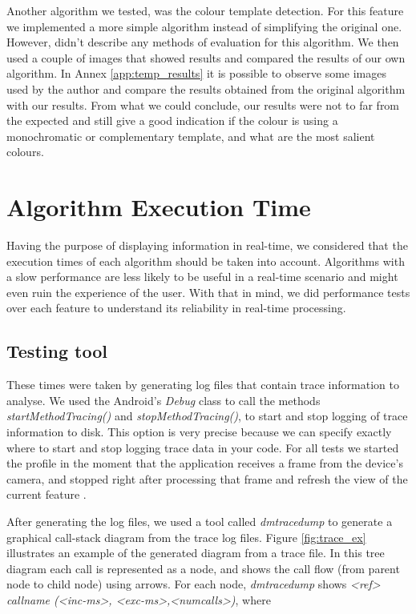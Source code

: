 Another algorithm we tested, was the colour template detection. For this feature we implemented a more simple algorithm instead of simplifying the original one. However, \citeauthor{cohen2006color} \cite{cohen2006color} didn't describe any methods of evaluation for this algorithm. We then used a couple of images that showed results and compared the results of our own algorithm. In Annex \ref{app:temp_results} it is possible to observe some images used by the author and compare the results obtained from the original algorithm with our results. From what we could conclude, our results were not to far from the expected and still give a good indication if the colour is using a monochromatic or complementary template, and what are the most salient colours.

\section{Algorithm Execution Time}

Having the purpose of displaying information in real-time, we considered that the execution times of each algorithm should be taken into account. Algorithms with a slow performance are less likely to be useful in a real-time scenario and might even ruin the experience of the user. With that in mind, we did performance tests over each feature to understand its reliability in real-time processing.


\subsection{Testing tool}
These times were taken by generating log files that contain trace information to analyse. We used the Android's \emph{Debug} class to call the methods \emph{startMethodTracing()} and \emph{stopMethodTracing()}, to start and stop logging of trace information to disk. This option is very precise because we can specify exactly where to start and stop logging trace data in your code. For all tests we started the profile in the moment that the application receives a frame from the device's camera, and stopped right after processing that frame and refresh the view of the current feature \cite{SDK}.

After generating the log files, we used a tool called \emph{dmtracedump} to generate a graphical call-stack diagram from the trace log files. Figure \ref{fig:trace_ex} illustrates an example of the generated diagram from a trace file. 
In this tree diagram each call is represented as a node, and shows the call flow (from parent node to child node) using arrows. For each node, \emph{dmtracedump} shows \emph{<ref> callname (<inc-ms>, <exc-ms>,<numcalls>)}, where

